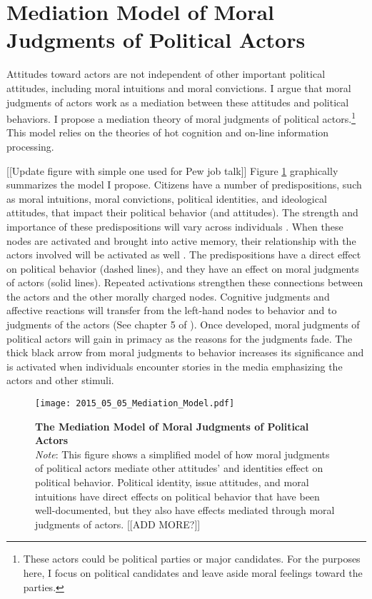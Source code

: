 \section{Mediation Model of Moral Judgments of Political Actors}\label{sec:theory_model}
Attitudes toward actors are not independent of other important political attitudes, including moral intuitions and moral convictions. I argue that moral judgments of actors work as a mediation between these attitudes and political behaviors. I propose a mediation theory of moral judgments of political actors.\footnote{These actors could be political parties or major candidates. For the purposes here, I focus on political candidates and leave aside moral feelings toward the parties.} This model relies on the theories of hot cognition and on-line information processing.

[[Update figure with simple one used for Pew job talk]] Figure \ref{fig:theory_mediation_model} graphically summarizes the model I propose. Citizens have a number of predispositions, such as moral intuitions, moral convictions, political identities, and ideological attitudes, that impact their political behavior (and attitudes). The strength and importance of these predispositions will vary across individuals \cite{Zaller1992}. When these nodes are activated and brought into active memory, their relationship with the actors involved will be activated as well \cite{TaberLodgeGlathar2001}. The predispositions have a direct effect on political behavior (dashed lines), and they have an effect on moral judgments of actors (solid lines). Repeated activations strengthen these connections between the actors and the other morally charged nodes. Cognitive judgments and affective reactions will transfer from the left-hand nodes to behavior and to judgments of the actors (See chapter 5 of ). Once developed, moral judgments of political actors will gain in primacy as the reasons for the judgments fade. The thick black arrow from moral judgments to behavior increases its significance and is activated when individuals encounter stories in the media emphasizing the actors and other stimuli.

\begin{figure}[htb]
  \centering
  \caption[The Mediation Model of Moral Judgments of Political Actors]{\textbf{The Mediation Model of Moral Judgments of Political Actors}\\ \footnotesize \textit{Note}: This figure shows a simplified model of how moral judgments of political actors mediate other attitudes' and identities effect on political behavior. Political identity, issue attitudes, and moral intuitions have direct effects on political behavior that have been well-documented, but they also have effects mediated through moral judgments of actors. [[ADD MORE?]]}\label{fig:theory_mediation_model}
  {\texttt{[image: 2015\_05\_05\_Mediation\_Model.pdf]}} \\
\end{figure}

